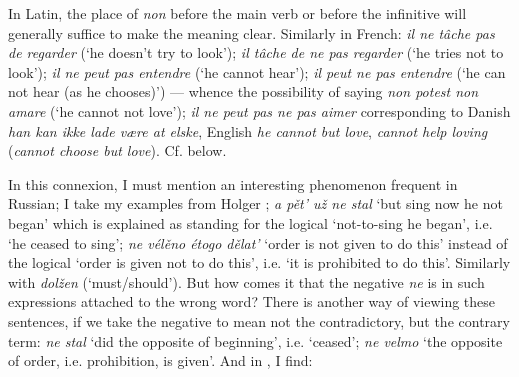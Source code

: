 In Latin, the place of \textit{non} before the main verb or before the infinitive will generally suffice to make the meaning clear. Similarly in French: \textit{il ne tâche pas de regarder} (`he doesn't try to look'); \textit{il tâche de ne pas regarder} (`he tries not to look'); \textit{il ne peut pas entendre} (`he cannot hear'); \textit{il peut ne pas entendre} (`he can not hear (as he chooses)') --- whence the possibility of saying \textit{non potest non amare} (`he cannot not love'); \textit{il ne peut pas ne pas aimer} corresponding to Danish \textit{han kan ikke lade være at elske}, English \textit{he cannot but love}, \textit{cannot help loving} (\textit{cannot choose but love}). Cf.  below. %

\label{para:not-to-sing}In this connexion, I must mention an interesting phenomenon frequent in Russian; I take my examples from Holger \citet[12]{pedersen1916russisk}; \textit{a pět' už ne stal} `but sing now he not began' %
which is explained as standing for the logical `not-to-sing he began', i.e. `he ceased to sing'; \textit{ne vélěno étogo dělat'} `order is not given to do this' instead of the logical `order is given not to do this', i.e. `it is prohibited to do this'. Similarly with \textit{dolžen} (`must/should'). But how comes it that the negative \textit{ne} is in such expressions attached to the wrong word? There is another way of viewing these sentences, if we take the negative to mean not the contradictory, but the contrary term: \textit{ne stal} `did the opposite of beginning', i.e. `ceased'; \textit{ne velmo} `the opposite of order, i.e. prohibition, is given'. And in \citet[\href{https://archive.org/details/vergleichendesl00vondgoog/page/399/mode/2up?q=\%22mitunter+wird+der+begriff\%22&view=theater}{400}]{vondrak1908vergleichende}, I find:

